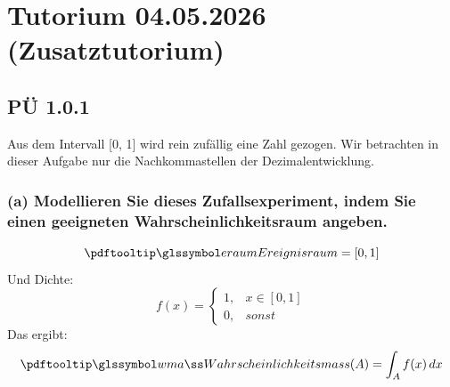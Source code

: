 \section{Tutorium 04.05.2026 (Zusatztutorium)}\label{ch:tutorium-04.05.2026}
\subsection{PÜ 1.0.1 \abhaken}\label{sec:pu-1.0.1}
Aus dem Intervall [0, 1] wird rein zufällig eine Zahl gezogen. Wir betrachten in dieser Aufgabe
nur die Nachkommastellen der Dezimalentwicklung.
\begin{auf}
    \subsubsection*{(a) Modellieren Sie dieses Zufallsexperiment, indem Sie einen geeigneten Wahrscheinlichkeitsraum angeben.}
    \[
        \eraum = [0,1]
    \]
    Und Dichte:
    \[
        f(x) = \begin{cases}
                   1, & x \in [0,1] \\
                   0, & sonst
        \end{cases}
    \]
    Das ergibt:
    \[
        \pe(A) = \int_A f(x) \dx
    \]
\end{auf}

